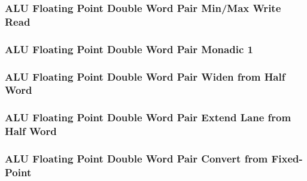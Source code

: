 \subsubsection[{\small ALU Floating Point Double Word Pair Min/Max Write Read}]{ALU Floating Point Double Word Pair Min/Max Write Read} \label{sec:format-ALU-FDPMMWR}



\subsubsection[{\small ALU Floating Point Double Word Pair Monadic 1}]{ALU Floating Point Double Word Pair Monadic 1} \label{sec:format-ALU-FDPMO1}



\subsubsection[{\small ALU Floating Point Double Word Pair Widen from Half Word}]{ALU Floating Point Double Word Pair Widen from Half Word} \label{sec:format-ALU-FDPWIDEWR}



\subsubsection[{\small ALU Floating Point Double Word Pair Extend Lane from Half Word}]{ALU Floating Point Double Word Pair Extend Lane from Half Word} \label{sec:format-ALU-FDPEXTLWR}



\subsubsection[{\small ALU Floating Point Double Word Pair Convert from Fixed-Point}]{ALU Floating Point Double Word Pair Convert from Fixed-Point} \label{sec:format-ALU-FDPFLOAT}



